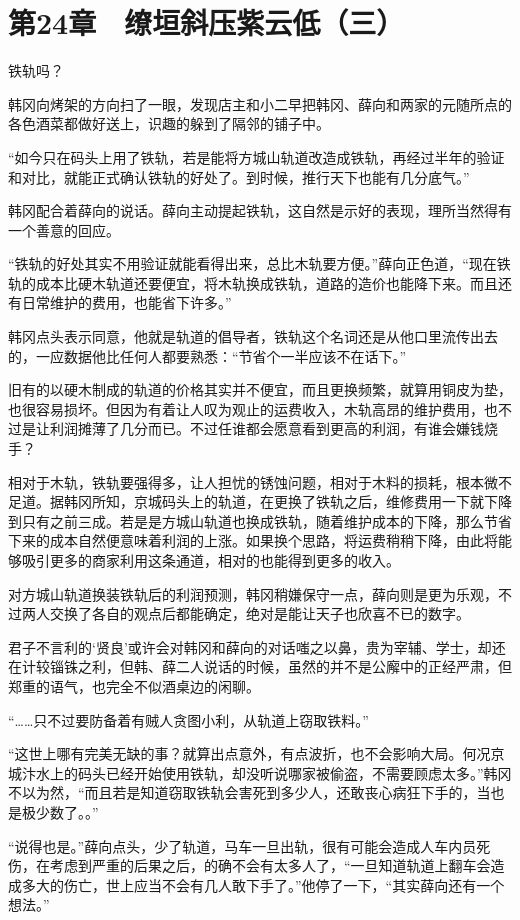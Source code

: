 \section{第24章　缭垣斜压紫云低（三）}

铁轨吗？

韩冈向烤架的方向扫了一眼，发现店主和小二早把韩冈、薛向和两家的元随所点的各色酒菜都做好送上，识趣的躲到了隔邻的铺子中。

“如今只在码头上用了铁轨，若是能将方城山轨道改造成铁轨，再经过半年的验证和对比，就能正式确认铁轨的好处了。到时候，推行天下也能有几分底气。”

韩冈配合着薛向的说话。薛向主动提起铁轨，这自然是示好的表现，理所当然得有一个善意的回应。

“铁轨的好处其实不用验证就能看得出来，总比木轨要方便。”薛向正色道，“现在铁轨的成本比硬木轨道还要便宜，将木轨换成铁轨，道路的造价也能降下来。而且还有日常维护的费用，也能省下许多。”

韩冈点头表示同意，他就是轨道的倡导者，铁轨这个名词还是从他口里流传出去的，一应数据他比任何人都要熟悉：“节省个一半应该不在话下。”

旧有的以硬木制成的轨道的价格其实并不便宜，而且更换频繁，就算用铜皮为垫，也很容易损坏。但因为有着让人叹为观止的运费收入，木轨高昂的维护费用，也不过是让利润摊薄了几分而已。不过任谁都会愿意看到更高的利润，有谁会嫌钱烧手？

相对于木轨，铁轨要强得多，让人担忧的锈蚀问题，相对于木料的损耗，根本微不足道。据韩冈所知，京城码头上的轨道，在更换了铁轨之后，维修费用一下就下降到只有之前三成。若是是方城山轨道也换成铁轨，随着维护成本的下降，那么节省下来的成本自然便意味着利润的上涨。如果换个思路，将运费稍稍下降，由此将能够吸引更多的商家利用这条通道，相对的也能得到更多的收入。

对方城山轨道换装铁轨后的利润预测，韩冈稍嫌保守一点，薛向则是更为乐观，不过两人交换了各自的观点后都能确定，绝对是能让天子也欣喜不已的数字。

君子不言利的‘贤良’或许会对韩冈和薛向的对话嗤之以鼻，贵为宰辅、学士，却还在计较锱铢之利，但韩、薛二人说话的时候，虽然的并不是公廨中的正经严肃，但郑重的语气，也完全不似酒桌边的闲聊。

“……只不过要防备着有贼人贪图小利，从轨道上窃取铁料。”

“这世上哪有完美无缺的事？就算出点意外，有点波折，也不会影响大局。何况京城汴水上的码头已经开始使用铁轨，却没听说哪家被偷盗，不需要顾虑太多。”韩冈不以为然，“而且若是知道窃取铁轨会害死到多少人，还敢丧心病狂下手的，当也是极少数了。。”

“说得也是。”薛向点头，少了轨道，马车一旦出轨，很有可能会造成人车内员死伤，在考虑到严重的后果之后，的确不会有太多人了，“一旦知道轨道上翻车会造成多大的伤亡，世上应当不会有几人敢下手了。”他停了一下，“其实薛向还有一个想法。”

